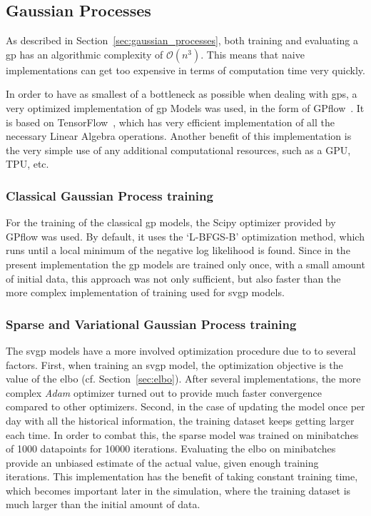 \subsection{Gaussian Processes}

As described in Section~\ref{sec:gaussian_processes}, both training and
evaluating a \acrshort{gp} has an algorithmic complexity of $\mathcal{O}(n^3)$.
This means that naive implementations can get too expensive in terms of
computation time very quickly.

In order to have as smallest of a bottleneck as possible when dealing with
\acrshort{gp}s, a very optimized implementation of \acrlong{gp} Models was
used, in the form of GPflow~\cite{matthewsGPflowGaussianProcess2017}. It is
based on TensorFlow~\cite{tensorflow2015-whitepaper}, which has very efficient
implementation of all the necessary Linear Algebra operations. Another benefit of
this implementation is the very simple use of any additional computational
resources, such as a GPU, TPU, etc.

\subsubsection{Classical Gaussian Process training}

For the training of the classical \acrshort{gp} models, the Scipy optimizer
provided by GPflow was used. By default, it uses the `L-BFGS-B' optimization
method, which runs until a local minimum of the negative log likelihood is
found. Since in the present implementation the \acrshort{gp} models are trained
only once, with a small amount of initial data, this approach was not only
sufficient, but also faster than the more complex implementation of training
used for \acrshort{svgp} models.

\subsubsection{Sparse and Variational Gaussian Process training}

The \acrshort{svgp} models have a more involved optimization procedure due to to
several factors. First, when training an \acrshort{svgp} model, the optimization
objective is the value of the \acrshort{elbo} (cf. Section~\ref{sec:elbo}).
After several implementations, the more complex \textit{Adam} optimizer turned
out to provide much faster convergence compared to other optimizers. Second, in
the case of updating the model once per day with all the historical information,
the training dataset keeps getting larger each time. In order to combat this,
the sparse model was trained on minibatches of 1000 datapoints for 10000
iterations. Evaluating the \acrshort{elbo} on minibatches provide an unbiased
estimate of the actual value, given enough training iterations. This
implementation has the benefit of taking constant training time, which becomes
important later in the simulation, where the training dataset is much larger
than the initial amount of data.  

